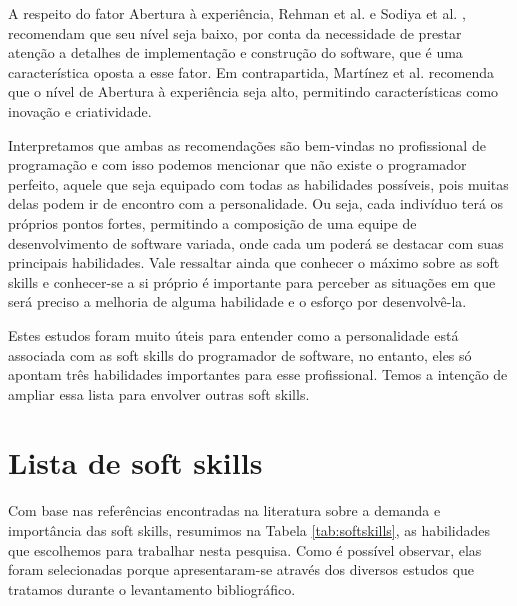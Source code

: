 A respeito do fator Abertura à experiência, Rehman et al. \cite{rehman:12} e Sodiya et al. \cite{sodiya:07}, recomendam que seu nível seja baixo, por conta da necessidade de prestar atenção a detalhes de implementação e construção do software, que é uma característica oposta a esse fator. Em contrapartida, Martínez et al. \cite{martinez:11} recomenda que o nível de Abertura à experiência seja alto, permitindo características como inovação e criatividade.

Interpretamos que ambas as recomendações são bem-vindas no profissional de programação e com isso podemos mencionar que não existe o programador perfeito, aquele que seja equipado com todas as habilidades possíveis, pois muitas delas podem ir de encontro com a personalidade. Ou seja, cada indivíduo terá os próprios pontos fortes, permitindo a composição de uma equipe de desenvolvimento de software variada, onde cada um poderá se destacar com suas principais habilidades. Vale ressaltar ainda que conhecer o máximo sobre as soft skills e conhecer-se a si próprio é importante para perceber as situações em que será preciso a melhoria de alguma habilidade e o esforço por desenvolvê-la.

Estes estudos foram muito úteis para entender como a personalidade está associada com as soft skills do programador de software, no entanto, eles só apontam três habilidades importantes para esse profissional. Temos a intenção de ampliar essa lista para envolver outras soft skills.

\section{Lista de soft skills}

Com base nas referências encontradas na literatura sobre a demanda e importância das soft skills, resumimos na Tabela \ref{tab:softskills}, as habilidades que escolhemos para trabalhar nesta pesquisa. Como é possível observar, elas foram selecionadas porque apresentaram-se através dos diversos estudos que tratamos durante o levantamento bibliográfico.

